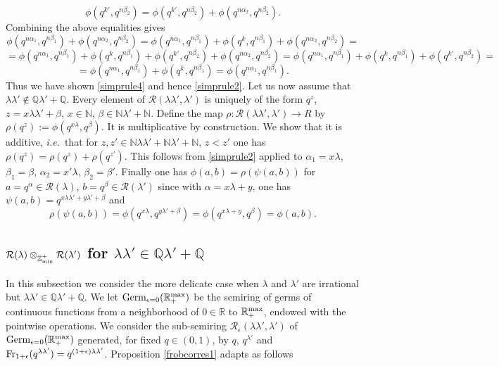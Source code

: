 \documentclass[noams,lp]{compositio}
\def\N{{\mathbb N}}
\def\Q{{\mathbb Q}}
\def\R{{\mathbb R}}
\def\Z{{\mathbb Z}}
\def\cR{{\mathcal R}}
\newcommand{\ie}{{\it i.e.\/}\ }
\def\zminp{\Z_{\rm min}^+}
\def\rmax{\R_+^{\rm max}}
\def\fr{{\rm Fr}}
\def\germ{{{\rm Germ}_{\epsilon=0}(\rmax)}}
\begin{document}
$$
\phi(q^{k'}, q^{n\beta_2})=\phi(q^{k'}, q^{n\beta_2})+\phi(q^{n\alpha_2}, q^{n\beta_2}).
$$
Combining the above equalities gives
$$
\phi(q^{n\alpha_1}, q^{n\beta_1}) +\phi(q^{n\alpha_2}, q^{n\beta_2})=\phi(q^{n\alpha_1}, q^{n\beta_1})+\phi(q^{k}, q^{n\beta_1})+\phi(q^{n\alpha_2}, q^{n\beta_2})=
$$
$$
=\phi(q^{n\alpha_1}, q^{n\beta_1})+\phi(q^{k}, q^{n\beta_1})+\phi(q^{k'}, q^{n\beta_2})+\phi(q^{n\alpha_2}, q^{n\beta_2})
=\phi(q^{n\alpha_1}, q^{n\beta_1})+\phi(q^{k}, q^{n\beta_1})+\phi(q^{k'}, q^{n\beta_2})=
$$
$$
=\phi(q^{n\alpha_1}, q^{n\beta_1})+\phi(q^{k}, q^{n\beta_1})=\phi(q^{n\alpha_1}, q^{n\beta_1}).
$$
Thus we have shown \eqref{simprule4} and hence \eqref{simprule2}. Let us now assume that  $\lambda\lambda'\notin \Q\lambda'+\Q$. Every element of  $\cR(\lambda\lambda',\lambda')$ is uniquely of the form $q^z$, $z=x\lambda\lambda'+\beta$, $x\in \N$, $\beta\in \N\lambda'+\N$.  Define the map $\rho: \cR(\lambda\lambda',\lambda')\to R$ by $\rho(q^z):=\phi(q^{x\lambda},q^{\beta})$. It is multiplicative by construction. We show that it is additive, \ie that for $z,z'\in \N\lambda\lambda'+\N\lambda'+\N$, $z<z'$ one has $\rho(q^z)=\rho(q^z)+\rho(q^{z'})$.
This follows from \eqref{simprule2} applied to $\alpha_1=x\lambda$, $\beta_1=\beta$, $\alpha_2=x'\lambda$, $\beta_2=\beta'$. Finally one has $\phi(a,b)=\rho(\psi(a,b))$ for $a=q^\alpha\in \cR(\lambda)$, $b=q^\beta\in \cR(\lambda')$ since with $\alpha=x\lambda +y$,  one has $\psi(a,b)=q^{x\lambda\lambda'+y\lambda'+\beta}$ and
$$
\rho(\psi(a,b))=\phi(q^{x\lambda},q^{y\lambda'+\beta})=\phi(q^{x\lambda+y},q^{\beta})=\phi(a,b).
$$
\endproof


\subsection{$\cR(\lambda)\otimes_{\zminp} \cR(\lambda')$ for $\lambda\lambda'\in \Q\lambda'+\Q$}
In this subsection we consider the more delicate case when $\lambda$ and $\lambda'$ are irrational but $\lambda\lambda'\in \Q\lambda'+\Q$. We let $\germ$ be the semiring of  germs of continuous functions from a neighborhood of $0\in \R$ to $\rmax$, endowed with the pointwise operations.  We consider the sub-semiring $\cR_\epsilon(\lambda\lambda',\lambda')$ of  $\germ$ generated, for fixed $q\in (0,1)$, by $q$, $q^{\lambda'}$ and $\fr_{1+\epsilon}(q^{\lambda\lambda'})=q^{(1+\epsilon)\lambda\lambda'}$. Proposition \ref{frobcorres1} adapts as follows
\end{document}
